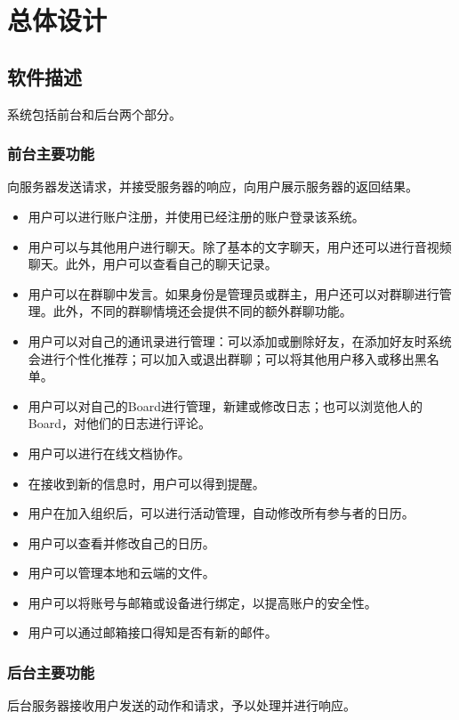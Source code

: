 \chapter{总体设计}
\section{软件描述}
    系统包括前台和后台两个部分。
\subsection{前台主要功能}
    向服务器发送请求，并接受服务器的响应，向用户展示服务器的返回结果。
    
    \begin{itemize}
        \item 用户可以进行账户注册，并使用已经注册的账户登录该系统。
        \item 用户可以与其他用户进行聊天。除了基本的文字聊天，用户还可以进行音视频聊天。此外，用户可以查看自己的聊天记录。
        \item 用户可以在群聊中发言。如果身份是管理员或群主，用户还可以对群聊进行管理。此外，不同的群聊情境还会提供不同的额外群聊功能。
        \item 用户可以对自己的通讯录进行管理：可以添加或删除好友，在添加好友时系统会进行个性化推荐；可以加入或退出群聊；可以将其他用户移入或移出黑名单。
        \item 用户可以对自己的Board进行管理，新建或修改日志；也可以浏览他人的Board，对他们的日志进行评论。
        \item 用户可以进行在线文档协作。
        \item 在接收到新的信息时，用户可以得到提醒。
        \item 用户在加入组织后，可以进行活动管理，自动修改所有参与者的日历。
        \item 用户可以查看并修改自己的日历。  
        \item 用户可以管理本地和云端的文件。
        \item 用户可以将账号与邮箱或设备进行绑定，以提高账户的安全性。
        \item 用户可以通过邮箱接口得知是否有新的邮件。
    \end{itemize}
    
\subsection{后台主要功能}
后台服务器接收用户发送的动作和请求，予以处理并进行响应。

